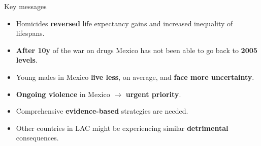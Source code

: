 \documentclass[xcolor={dvipsnames}]{beamer}
\begin{document}
\begin{frame}
\Large{
Key messages \pause

		\begin{itemize}
		
		\item Homicides \textbf{reversed} life expectancy gains and increased inequality of lifespans. \pause

		\item \textbf{After 10y} of the war on drugs Mexico has not been able to go back to \textbf{2005 levels}. \pause
		
		\item Young males in Mexico \textbf{live less}, on average, and \textbf{face more uncertainty}.\pause
		
		\item \textbf{Ongoing violence} in Mexico $\longrightarrow$ \textbf{urgent priority}. \pause
		
		 \item Comprehensive \textbf{evidence-based} strategies are needed.\pause
		
		\item Other countries in LAC might be experiencing similar \textbf{detrimental} consequences.
						
		\end{itemize}

}
\end{frame}






\end{document}
